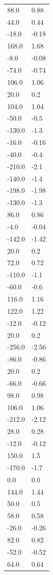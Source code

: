 \begin{longtable}{ll}
88.0 & 0.88 \\
44.0 & 0.44 \\
-18.0 & -0.18 \\
168.0 & 1.68 \\
-8.0 & -0.08 \\
-74.0 & -0.74 \\
106.0 & 1.06 \\
20.0 & 0.2 \\
104.0 & 1.04 \\
-50.0 & -0.5 \\
-130.0 & -1.3 \\
-16.0 & -0.16 \\
-40.0 & -0.4 \\
-210.0 & -2.1 \\
-140.0 & -1.4 \\
-198.0 & -1.98 \\
-130.0 & -1.3 \\
86.0 & 0.86 \\
-4.0 & -0.04 \\
-142.0 & -1.42 \\
20.0 & 0.2 \\
72.0 & 0.72 \\
-110.0 & -1.1 \\
-60.0 & -0.6 \\
116.0 & 1.16 \\
122.0 & 1.22 \\
-12.0 & -0.12 \\
20.0 & 0.2 \\
-256.0 & -2.56 \\
-86.0 & -0.86 \\
20.0 & 0.2 \\
-66.0 & -0.66 \\
98.0 & 0.98 \\
106.0 & 1.06 \\
-212.0 & -2.12 \\
28.0 & 0.28 \\
-12.0 & -0.12 \\
150.0 & 1.5 \\
-170.0 & -1.7 \\
0.0 & 0.0 \\
144.0 & 1.44 \\
50.0 & 0.5 \\
58.0 & 0.58 \\
-26.0 & -0.26 \\
82.0 & 0.82 \\
-52.0 & -0.52 \\
64.0 & 0.64 \\

\end{longtable}
